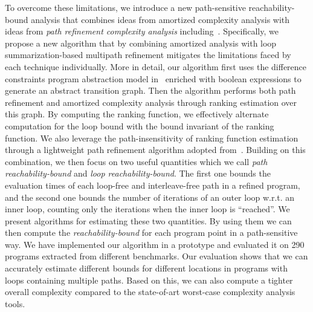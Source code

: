 To overcome these limitations, 
we introduce a new path-sensitive reachability-bound analysis that combines ideas from amortized complexity analysis with ideas from 
\emph{path refinement complexity analysis} including~\cite{GustafssonEL05,ManoliosV06,BalakrishnanSIG09,SharmaDDA11,Flores-MontoyaH14,HumenbergerJK18,CyphertBKR19,GulwaniJK09,ZulegerGSV11}.
Specifically, we propose a new algorithm that by combining amortized analysis with loop summarization-based multipath refinement mitigates the limitations faced by each technique individually. 
%
More in detail, our algorithm first uses the difference constraints program abstraction model in~\cite{SinnZV17,SinnZV14} enriched with boolean expressions to generate an abstract transition graph.
Then the algorithm performs both path refinement and amortized complexity analysis through ranking estimation over this graph.
By computing the ranking function, we effectively alternate computation for the loop bound with the bound invariant of the ranking function. 
We also leverage the path-insensitivity of ranking function estimation through a lightweight path refinement algorithm adopted from~\cite{GulwaniJK09}.
Building on this combination, we then focus on two useful quantities which we call \emph{path reachability-bound} and \emph{loop reachability-bound}.
The first one bounds the evaluation times of each loop-free and interleave-free path in a refined program, and the second one bounds the number of iterations of an outer loop w.r.t. an inner loop, counting only the iterations when the inner loop is ``reached''. 
We present algorithms for estimating these two quantities. By using them we can then 
compute the \emph{reachability-bound} for each program point in a path-sensitive way.
We have implemented our algorithm in a prototype and evaluated it on 290 programs extracted from different benchmarks. Our evaluation %
shows that we can accurately estimate different bounds for different locations in programs with loops containing multiple paths. Based on this, we can also compute a tighter overall complexity compared to the state-of-art worst-case complexity analysis tools.

